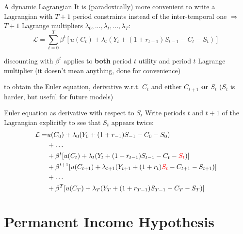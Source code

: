 \documentclass{beamer}
\newenvironment{mytemize}
{\vfill\itemize[nolistsep,itemsep=\fill,label=\color{blue}{$\triangleright$}]}
  {\enditemize}
\newcommand{\rarr}{$\Rightarrow$\ }
\begin{document}
\begin{frame}{A dynamic Lagrangian}
It is (paradoxically) more convenient to write a Lagrangian with $T+1$ period constraints instead of the inter-temporal one \rarr $T+1$ Lagrange multipliers 
$ \lambda_0, ..., \lambda_{t}, ..., \lambda_{T}$:
$$\mathcal{L} = \sum_{t=0}^{T} \beta^{t} [u(C_{t}) + \lambda_{t} (Y_{t}+(1+r_{t-1})S_{t-1}-C_{t}-S_{t})] $$
\begin{mytemize}
    \item discounting with $\beta^t$ applies to \textbf{both} period $t$ utility and period $t$ Lagrange multiplier (it doesn't mean anything, done for convenience)
    \item to obtain the Euler equation, derivative w.r.t. $C_t$ and either $C_{t+1}$ \textbf{or} $S_t$ \textcolor{mint}{($S_t$ is harder, but useful for future models)}
\end{mytemize}
\end{frame}

\begin{frame}{Euler equation as derivative with respect to $S_t$}
   Write periods $t$ and $t+1$ of the Lagrangian explicitly to see that $S_t$ appears twice:  \begin{align*}
\mathcal{L} =& 
  u(C_0) + \lambda_{0} (Y_{0}+(1+r_{-1})S_{-1}-C_{0}-S_{0})  \\
  &+ \dots \\
  &+\beta^t [u(C_t) + \lambda_{t} (Y_{t}+(1+r_{t-1})S_{t-1}-C_{t}-\textcolor{red}{S_{t}})] \\
  &+\beta^{t+1} [u(C_{t+1}) + \lambda_{t+1} (Y_{t+1}+(1+r_{t})\textcolor{red}{S_{t}}-C_{t+1}-S_{t+1})] \\
   &+ \dots \\
  &+\beta^T [u(C_T) + \lambda_{T} (Y_{T}+(1+r_{T-1})S_{T-1}-C_{T}-S_{T})] 
\end{align*}
\end{frame}

\section{Permanent Income Hypothesis}
\end{document}
